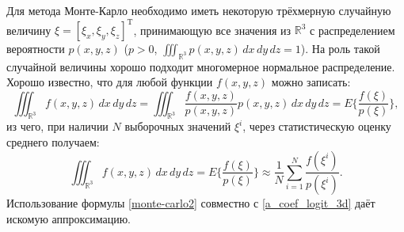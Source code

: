 Для метода Монте-Карло необходимо иметь некоторую трёхмерную случайную величину $\xi = {[\xi_x, \xi_y, \xi_z]}^\mathrm{T}$, принимающую все значения из $\mathbb{R}^3$ с распределением вероятности $p(x, y, z)$ ($p > 0$, $\iiint_{\mathbb{R}^3}p(x, y, z)\, dx\, dy\, dz = 1$). На роль такой случайной величины хорошо подходит многомерное нормальное распределение. Хорошо известно, что для любой функции $f(x, y, z)$ можно записать:
\begin{equation}
	\iiint_{\mathbb{R}^3}f(x,y,z)\, dx\, dy\, dz=\iiint_{\mathbb{R}^3}\frac{f(x,y,z)}{p(x,y,z)}p(x,y,z)\, dx\, dy\, dz=E\{\frac{f(\xi)}{p(\xi)}\},
	\label{monte-carlo1}
\end{equation}
из чего, при наличии $N$ выборочных значений $\xi^i$, через статистическую оценку среднего получаем:
\begin{equation}
	\iiint_{\mathbb{R}^3}f(x,y,z)\, dx\, dy\, dz=E\{\frac{f(\xi)}{p(\xi)}\} \approx \frac{1}{N}\sum_{i=1}^N\frac{f(\xi^i)}{p(\xi^i)}.
	\label{monte-carlo2}
\end{equation}
Использование формулы \ref{monte-carlo2} совместно с \ref{a_coef_logit_3d} даёт искомую аппроксимацию.

